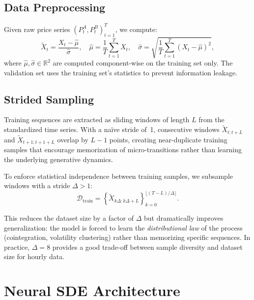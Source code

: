\documentclass[11pt, a4paper]{article}
\newcommand{\R}{\mathbb{R}}
\begin{document}
\subsection{Data Preprocessing}

Given raw price series $(P^A_t, P^B_t)_{t=1}^{T}$, we compute:
\begin{equation}
    \tilde{X}_t = \frac{X_t - \hat{\mu}}{\hat{\sigma}}, \quad
    \hat{\mu} = \frac{1}{T}\sum_{t=1}^T X_t, \quad
    \hat{\sigma} = \sqrt{\frac{1}{T}\sum_{t=1}^T (X_t - \hat{\mu})^2},
\end{equation}
where $\hat{\mu}, \hat{\sigma} \in \R^2$ are computed component-wise on the training set only. The validation set uses the training set's statistics to prevent information leakage.

\subsection{Strided Sampling}

Training sequences are extracted as sliding windows of length $L$ from the standardized time series. With a naïve stride of~1, consecutive windows $\tilde{X}_{t:t+L}$ and $\tilde{X}_{t+1:t+1+L}$ overlap by $L-1$ points, creating near-duplicate training samples that encourage memorization of micro-transitions rather than learning the underlying generative dynamics.

To enforce statistical independence between training samples, we subsample windows with a stride $\Delta > 1$:
\begin{equation}
    \mathcal{D}_{\text{train}} = \left\{\tilde{X}_{k\Delta : k\Delta + L}\right\}_{k=0}^{\lfloor (T-L)/\Delta \rfloor}.
\end{equation}

This reduces the dataset size by a factor of $\Delta$ but dramatically improves generalization: the model is forced to learn the \emph{distributional law} of the process (cointegration, volatility clustering) rather than memorizing specific sequences. In practice, $\Delta = 8$ provides a good trade-off between sample diversity and dataset size for hourly data.

\section{Neural SDE Architecture}
\label{sec:model}
\end{document}
